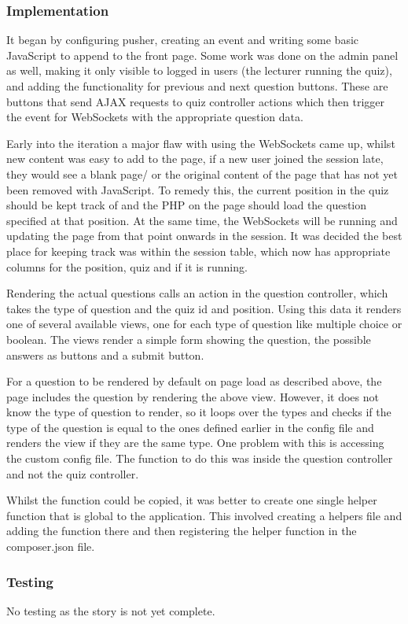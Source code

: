 \begin{center}
\begin{figure}
		\label{fig:quiz-mobile}
	\end{figure}
\end{center}


\subsubsection{Implementation}
It began by configuring pusher, creating an event and writing some basic JavaScript to append to the front page. Some work was done on the admin panel as well, making it only visible to logged in users (the lecturer running the quiz), and adding the functionality for previous and next question buttons. These are buttons that send AJAX requests to quiz controller actions which then trigger the event for WebSockets with the appropriate question data.

Early into the iteration a major flaw with using the WebSockets came up, whilst new content was easy to add to the page, if a new user joined the session late, they would see a blank page/ or the original content of the page that has not yet been removed with JavaScript. To remedy this, the current position in the quiz should be kept track of and the PHP on the page should load the question specified at that position. At the same time, the WebSockets will be running and updating the page from that point onwards in the session. It was decided the best place for keeping track was within the session table, which now has appropriate columns for the position, quiz and if it is running.

Rendering the actual questions calls an action in the question controller, which takes the type of question and the quiz id and position. Using this data it renders one of several available views, one for each type of question like multiple choice or boolean. The views render a simple form showing the question, the possible answers as buttons and a submit button.

For a question to be rendered by default on page load as described above, the page includes the question by rendering the above view. However, it does not know the type of question to render, so it loops over the types and checks if the type of the question is equal to the ones defined earlier in the config file and renders the view if they are the same type. One problem with this is accessing the custom config file. The function to do this was inside the question controller and not the quiz controller. 

Whilst the function could be copied, it was better to create one single helper function that is global to the application. This involved creating a helpers file and adding the function there and then registering the helper function in the composer.json file\cite{laravel-helper-function}.

\subsubsection{Testing}
No testing as the story is not yet complete.
\newpage
